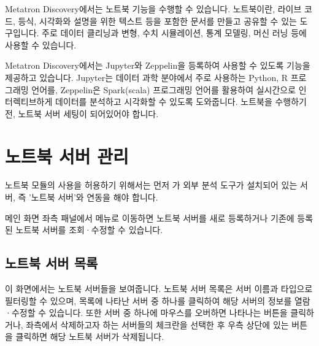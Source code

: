 \documentclass[letterpaper,10pt,english]{sphinxmanual}
\begin{document}
Metatron Discovery에서는 노트북 기능을 수행할 수 있습니다. 노트북이란, 라이브 코드, 등식, 시각화와 설명을 위한 텍스트 등을 포함한 문서를 만들고 공유할 수 있는 도구입니다.
주로 데이터 클리닝과 변형, 수치 시뮬레이션, 통계 모델링, 머신 러닝 등에 사용할 수 있습니다.

Metatron Discovery에서는 Jupyter와 Zeppelin을 등록하여 사용할 수 있도록 기능을 제공하고 있습니다. Jupyter는 데이터 과학 분야에서 주로 사용하는 Python, R 프로그래밍 언어를, Zeppelin은 Spark(scala) 프로그래밍 언어를 활용하여 실시간으로 인터렉티브하게 데이터를 분석하고 시각화할 수 있도록 도와줍니다. 노트북을 수행하기 전, 노트북 서버 세팅이 되어있어야 합니다.


\section{노트북 서버 관리}
\label{\detokenize{discovery/part05/notebook_management:id1}}\label{\detokenize{discovery/part05/notebook_management::doc}}
노트북 모듈의 사용을 허용하기 위해서는 먼저 가 외부 분석 도구가 설치되어 있는 서버, 즉 '노트북 서버'와 연동을 해야 합니다.

메인 화면 좌측 패널에서  메뉴로 이동하면 노트북 서버를 새로 등록하거나 기존에 등록된 노트북 서버를 조회·수정할 수 있습니다.
\begin{quote}

\begin{figure}[H]
\centering

\noindent{}
\end{figure}
\end{quote}


\subsection{노트북 서버 목록}
\label{\detokenize{discovery/part05/notebook_management:id2}}
이 화면에서는 노트북 서버들을 보여줍니다.
노트북 서버 목록은 서버 이름과 타입으로 필터링할 수 있으며, 목록에 나타난 서버 중 하나를 클릭하여 해당 서버의 정보를 열람·수정할 수 있습니다.
또한 서버 중 하나에 마우스를 오버하면 나타나는  버튼을 클릭하거나, 좌측에서 삭제하고자 하는 서버들의 체크란을 선택한 후 우측 상단에 있는  버튼을 클릭하면 해당 노트북 서버가 삭제됩니다.
\begin{quote}

\begin{figure}[H]
\centering

\noindent{}
\end{figure}
\end{quote}
\end{document}
